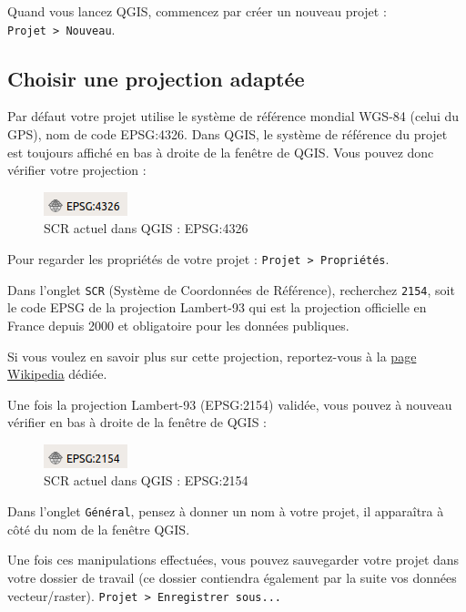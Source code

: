 Quand vous lancez QGIS, commencez par créer un nouveau projet :
\texttt{Projet\ \textgreater{}\ Nouveau}.

\hypertarget{choisir-une-projection-adaptuxe9e}{%
\subsection{Choisir une projection
adaptée}\label{choisir-une-projection-adaptuxe9e}}

Par défaut votre projet utilise le système de référence mondial WGS-84
(celui du GPS), nom de code EPSG:4326. Dans QGIS, le système de
référence du projet est toujours affiché en bas à droite de la fenêtre
de QGIS. Vous pouvez donc vérifier votre projection :

\begin{figure}
\centering
\includegraphics{figures/EPSG4326.png}
\caption{SCR actuel dans QGIS : EPSG:4326}
\end{figure}

Pour regarder les propriétés de votre projet :
\texttt{Projet\ \textgreater{}\ Propriétés}.

Dans l'onglet \texttt{SCR} (Système de Coordonnées de Référence),
recherchez \texttt{2154}, soit le code EPSG de la projection Lambert-93
qui est la projection officielle en France depuis 2000 et obligatoire
pour les données publiques.

Si vous voulez en savoir plus sur cette projection, reportez-vous à la
\href{https://fr.wikipedia.org/wiki/Projection_conique_conforme_de_Lambert}{page
Wikipedia} dédiée.

Une fois la projection Lambert-93 (EPSG:2154) validée, vous pouvez à
nouveau vérifier en bas à droite de la fenêtre de QGIS :

\begin{figure}
\centering
\includegraphics{figures/EPSG2154.png}
\caption{SCR actuel dans QGIS : EPSG:2154}
\end{figure}

Dans l'onglet \texttt{Général}, pensez à donner un nom à votre projet,
il apparaîtra à côté du nom de la fenêtre QGIS.

Une fois ces manipulations effectuées, vous pouvez sauvegarder votre
projet dans votre dossier de travail (ce dossier contiendra également
par la suite vos données vecteur/raster).
\texttt{Projet\ \textgreater{}\ Enregistrer\ sous...}

